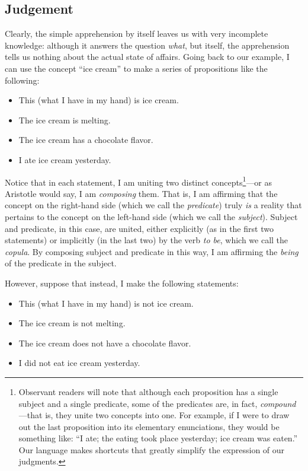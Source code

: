 \documentclass[
  12pt,
]{memoir}
\providecommand{\tightlist}{%
  \setlength{\itemsep}{0pt}\setlength{\parskip}{0pt}}
\begin{document}
\subsection{Judgement}\label{judgement}

Clearly, the simple apprehension by itself leaves us with very
incomplete knowledge: although it answers the question \emph{what}, but
itself, the apprehension tells us nothing about the actual state of
affairs. Going back to our example, I can use the concept ``ice cream''
to make a series of propositions like the following:

\begin{itemize}
\tightlist
\item
  This (what I have in my hand) is ice cream.
\item
  The ice cream is melting.
\item
  The ice cream has a chocolate flavor.
\item
  I ate ice cream yesterday.
\end{itemize}

\noindent Notice that in each statement, I am uniting two distinct
concepts\footnote{Observant readers will note that although each
  proposition has a single subject and a single predicate, some of the
  predicates are, in fact, \emph{compound}---that is, they unite two
  concepts into one. For example, if I were to draw out the last
  proposition into its elementary enunciations, they would be something
  like: ``I ate; the eating took place yesterday; ice cream was eaten.''
  Our language makes shortcuts that greatly simplify the expression of
  our judgments.}---or as Aristotle would say, I am \emph{composing}
them. That is, I am affirming that the concept on the right-hand side
(which we call the \emph{predicate}) truly \emph{is} a reality that
pertains to the concept on the left-hand side (which we call the
\emph{subject}). Subject and predicate, in this case, are united, either
explicitly (as in the first two statements) or implicitly (in the last
two) by the verb \emph{to be}, which we call the \emph{copula}. By
composing subject and predicate in this way, I am affirming the
\emph{being} of the predicate in the subject.

However, suppose that instead, I make the following statements:

\begin{itemize}
\tightlist
\item
  This (what I have in my hand) is not ice cream.
\item
  The ice cream is not melting.
\item
  The ice cream does not have a chocolate flavor.
\item
  I did not eat ice cream yesterday.
\end{itemize}
\end{document}
